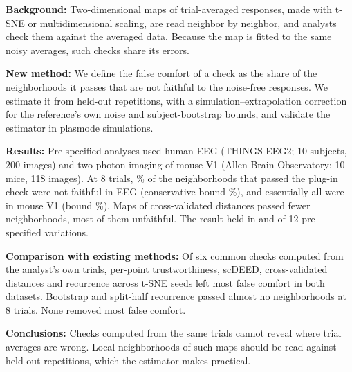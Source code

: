 \noindent\textbf{Background:} Two-dimensional maps of trial-averaged responses, made with t-SNE or
multidimensional scaling, are read neighbor by neighbor, and analysts check them against the
averaged data. Because the map is fitted to the same noisy averages, such checks share its errors.

\noindent\textbf{New method:} We define the false comfort of a check as the share of the
neighborhoods it passes that are not faithful to the noise-free responses. We estimate it from
held-out repetitions, with a simulation--extrapolation correction for the reference's own noise and
subject-bootstrap bounds, and validate the estimator in plasmode simulations.

\noindent\textbf{Results:} Pre-specified analyses used human EEG (THINGS-EEG2; 10 subjects,
200 images) and two-photon imaging of mouse V1 (Allen Brain Observatory; 10 mice, 118 images). At 8 trials, \EegFCeight\% of the neighborhoods that passed the plug-in check were not
faithful in EEG (conservative bound \EegLeight\%), and essentially all were in mouse V1 (bound
\MouseLeight\%). Maps of cross-validated distances passed fewer neighborhoods, most of them
unfaithful. The result held in \EegCells{} and \MouseCells{} of 12 pre-specified variations.

\noindent\textbf{Comparison with existing methods:} Of six common checks computed from the
analyst's own trials, per-point trustworthiness, scDEED, cross-validated distances and recurrence
across t-SNE seeds left most false comfort in both datasets. Bootstrap and split-half recurrence
passed almost no neighborhoods at 8 trials. None removed most false comfort.

\noindent\textbf{Conclusions:} Checks computed from the same trials cannot reveal where trial
averages are wrong. Local neighborhoods of such maps should be read against held-out repetitions,
which the estimator makes practical.
